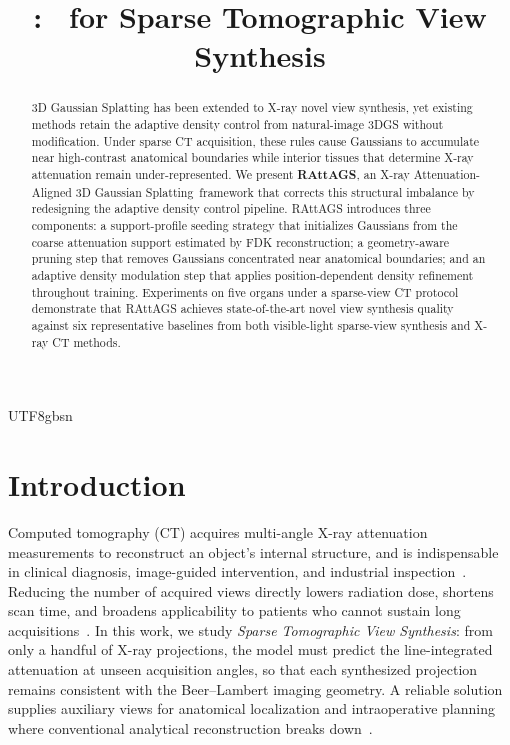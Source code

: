 \documentclass{egpubl}
\title[\traceplain\ for Sparse Tomographic View Synthesis]{\RAttAGS: \tracefull\ for Sparse Tomographic View Synthesis}
\newcommand{\traceplain}{RAttAGS}
\newcommand{\RAttAGS}{\textbf{\traceplain}}
\newcommand{\tracefull}{X-ray Attenuation-Aligned 3D Gaussian Splatting}
\begin{document}
\ifXeTeX\else\begin{CJK*}{UTF8}{gbsn}\fi
\maketitle

\begin{abstract}
3D Gaussian Splatting has been extended to X-ray novel view synthesis, yet existing methods retain the adaptive density control from natural-image 3DGS without modification. Under sparse CT acquisition, these rules cause Gaussians to accumulate near high-contrast anatomical boundaries while interior tissues that determine X-ray attenuation remain under-represented. We present \RAttAGS, an \tracefull\ framework that corrects this structural imbalance by redesigning the adaptive density control pipeline. RAttAGS introduces three components: a support-profile seeding strategy that initializes Gaussians from the coarse attenuation support estimated by FDK reconstruction; a geometry-aware pruning step that removes Gaussians concentrated near anatomical boundaries; and an adaptive density modulation step that applies position-dependent density refinement throughout training. Experiments on five organs under a sparse-view CT protocol demonstrate that RAttAGS achieves state-of-the-art novel view synthesis quality against six representative baselines from both visible-light sparse-view synthesis and X-ray CT methods.
\end{abstract}

\section{Introduction}
\label{sec:intro}

Computed tomography (CT) acquires multi-angle X-ray attenuation measurements to reconstruct an object's internal structure, and is indispensable in clinical diagnosis, image-guided intervention, and industrial inspection~\cite{feldkamp1984practical,andersen1984simultaneous,wang2008image}. Reducing the number of acquired views directly lowers radiation dose, shortens scan time, and broadens applicability to patients who cannot sustain long acquisitions~\cite{li2023gloredi}. In this work, we study \emph{Sparse Tomographic View Synthesis}: from only a handful of X-ray projections, the model must predict the line-integrated attenuation at unseen acquisition angles, so that each synthesized projection remains consistent with the Beer--Lambert imaging geometry. A reliable solution supplies auxiliary views for anatomical localization and intraoperative planning where conventional analytical reconstruction breaks down~\cite{willemink2019evolution}.


\end{CJK*}
\end{document}
